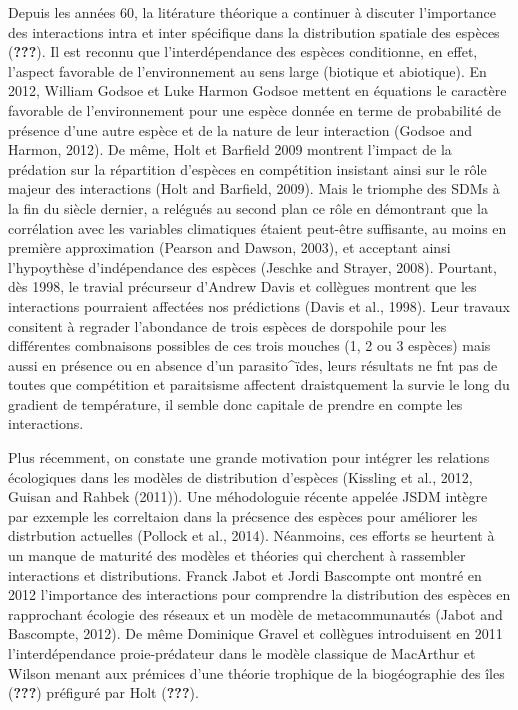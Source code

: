 Depuis les années 60, la litérature théorique a continuer à discuter
l'importance des interactions intra et inter spécifique dans la
distribution spatiale des espèces ({\textbf{???}}). Il est reconnu que
l'interdépendance des espèces conditionne, en effet, l'aspect favorable
de l'environnement au sens large (biotique et abiotique). En 2012,
William Godsoe et Luke Harmon Godsoe mettent en équations le caractère
favorable de l'environnement pour une espèce donnée en terme de
probabilité de présence d'une autre espèce et de la nature de leur
interaction (Godsoe and Harmon, 2012). De même, Holt et Barfield 2009
montrent l'impact de la prédation sur la répartition d'espèces en
compétition insistant ainsi sur le rôle majeur des interactions (Holt
and Barfield, 2009). Mais le triomphe des SDMs à la fin du siècle
dernier, a relégués au second plan ce rôle en démontrant que la
corrélation avec les variables climatiques étaient peut-être suffisante,
au moins en première approximation (Pearson and Dawson, 2003), et
acceptant ainsi l'hypoythèse d'indépendance des espèces (Jeschke and
Strayer, 2008). Pourtant, dès 1998, le travial précurseur d'Andrew Davis
et collègues montrent que les interactions pourraient affectées nos
prédictions (Davis et al., 1998). Leur travaux consitent à regrader
l'abondance de trois espèces de dorspohile pour les différentes
combnaisons possibles de ces trois mouches (1, 2 ou 3 espèces) mais
aussi en présence ou en absence d'un parasito\^{}ïdes, leurs résultats
ne fnt pas de toutes que compétition et paraitsisme affectent
draistquement la survie le long du gradient de température, il semble
donc capitale de prendre en compte les interactions.

Plus récemment, on constate une grande motivation pour intégrer les
relations écologiques dans les modèles de distribution d'espèces
(Kissling et al., 2012, Guisan and Rahbek (2011)). Une méhodologuie
récente appelée JSDM intègre par ezxemple les correltaion dans la
précsence des espèces pour améliorer les distrbution actuelles (Pollock
et al., 2014). Néanmoins, ces efforts se heurtent à un manque de
maturité des modèles et théories qui cherchent à rassembler interactions
et distributions. Franck Jabot et Jordi Bascompte ont montré en 2012
l'importance des interactions pour comprendre la distribution des
espèces en rapprochant écologie des réseaux et un modèle de
metacommunautés (Jabot and Bascompte, 2012). De même Dominique Gravel et
collègues introduisent en 2011 l'interdépendance proie-prédateur dans le
modèle classique de MacArthur et Wilson menant aux prémices d'une
théorie trophique de la biogéographie des îles ({\textbf{???}})
préfiguré par Holt ({\textbf{???}}).

